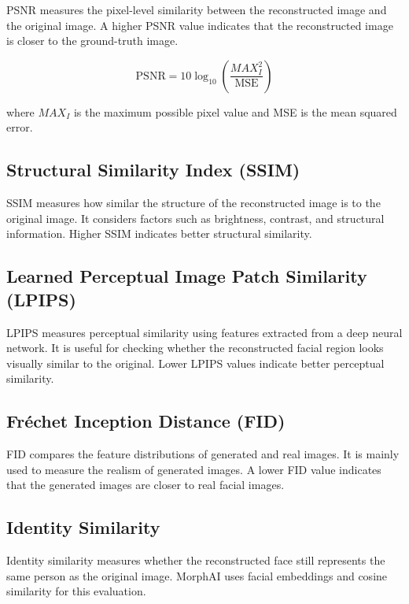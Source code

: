 PSNR measures the pixel-level similarity between the reconstructed image and the original image. A higher PSNR value indicates that the reconstructed image is closer to the ground-truth image.

\begin{equation}
\text{PSNR} =
10\log_{10}\left(\frac{MAX_I^2}{\text{MSE}}\right)
\end{equation}

\noindent where $MAX_I$ is the maximum possible pixel value and MSE is the mean squared error.

\subsection{Structural Similarity Index (SSIM)}

SSIM measures how similar the structure of the reconstructed image is to the original image. It considers factors such as brightness, contrast, and structural information. Higher SSIM indicates better structural similarity.

\subsection{Learned Perceptual Image Patch Similarity (LPIPS)}

LPIPS measures perceptual similarity using features extracted from a deep neural network. It is useful for checking whether the reconstructed facial region looks visually similar to the original. Lower LPIPS values indicate better perceptual similarity.

\subsection{Fréchet Inception Distance (FID)}

FID compares the feature distributions of generated and real images. It is mainly used to measure the realism of generated images. A lower FID value indicates that the generated images are closer to real facial images.

\subsection{Identity Similarity}

Identity similarity measures whether the reconstructed face still represents the same person as the original image. MorphAI uses facial embeddings and cosine similarity for this evaluation.

